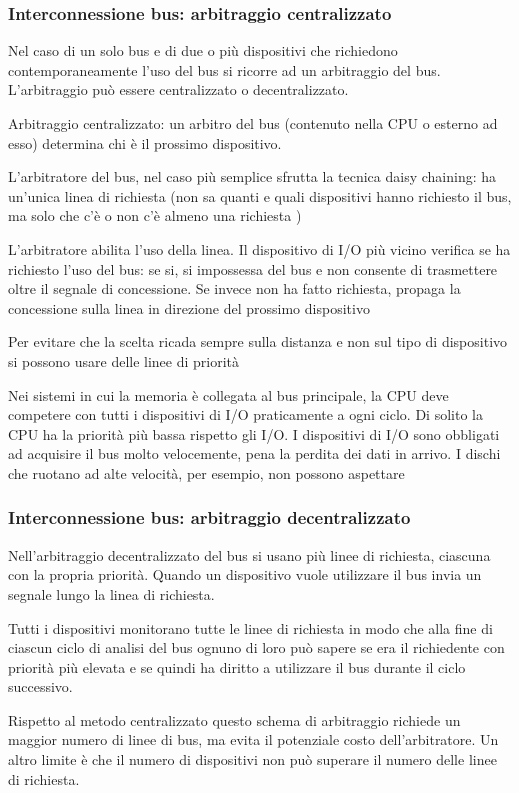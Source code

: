 \documentclass[12pt]{article}
\begin{document}
\subsubsection{Interconnessione bus: arbitraggio centralizzato}
Nel caso di un solo bus e di due o più dispositivi che richiedono contemporaneamente l'uso del bus si ricorre ad un arbitraggio del bus. L'arbitraggio può essere centralizzato o decentralizzato.\par\medskip\noindent
Arbitraggio centralizzato: un arbitro del bus (contenuto nella CPU o esterno ad esso) determina chi è il prossimo dispositivo.\par\medskip\noindent
L'arbitratore del bus, nel caso più semplice sfrutta la tecnica daisy chaining: ha un’unica linea di richiesta (non sa quanti e quali dispositivi hanno richiesto il bus, ma solo che c'è o non c'è almeno una richiesta )\par\medskip\noindent
L'arbitratore abilita l'uso della linea. Il dispositivo di I/O più vicino verifica se ha richiesto l'uso del bus: se si, si impossessa del bus e non consente di trasmettere oltre il segnale di concessione. Se invece non ha fatto richiesta, propaga la concessione sulla linea in direzione del
prossimo dispositivo\par\medskip\noindent
Per evitare che la scelta ricada sempre sulla distanza e non sul tipo di dispositivo si possono usare delle linee di priorità\par\medskip\noindent
Nei sistemi in cui la memoria è collegata al bus principale, la CPU deve competere con tutti i dispositivi di I/O praticamente a ogni ciclo. Di solito la CPU ha la priorità più bassa rispetto gli I/O. I dispositivi di I/O sono obbligati ad acquisire il bus molto velocemente, pena la perdita dei dati in arrivo. I dischi che ruotano ad alte velocità, per esempio, non possono aspettare\par\medskip\noindent
\subsubsection{Interconnessione bus: arbitraggio decentralizzato}
Nell'arbitraggio decentralizzato del bus si usano più linee di richiesta, ciascuna con la
propria priorità. Quando un dispositivo vuole utilizzare il bus invia un segnale lungo la linea di richiesta.\par\medskip\noindent
Tutti i dispositivi monitorano tutte le linee di richiesta in modo che alla fine di ciascun ciclo di analisi del bus ognuno di loro può sapere se era il richiedente con priorità più elevata e se quindi ha diritto a utilizzare il bus durante il ciclo successivo. \par\medskip\noindent
Rispetto al metodo centralizzato questo schema di arbitraggio richiede un maggior numero di linee di bus, ma evita il potenziale costo dell’arbitratore. Un altro limite è che il numero di dispositivi non può superare il numero delle linee di richiesta.
\newpage
\end{document}
